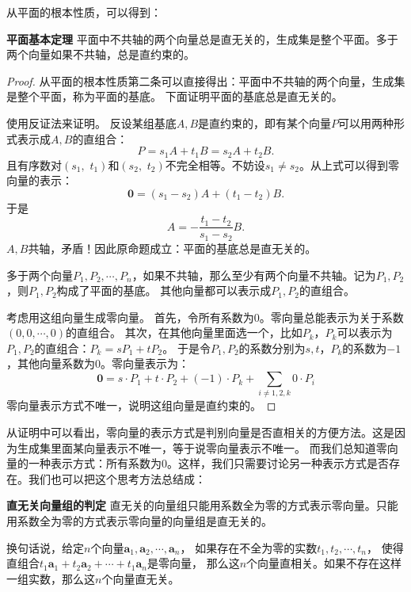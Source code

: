 \documentclass[12pt,UTF8,fontset=none]{ctexbook}
\begin{document}
从平面的根本性质，可以得到：
\begin{tm}{\textbf{平面基本定理}}\label{tm:0-0-20}
    平面中不共轴的两个向量总是直无关的，生成集是整个平面。多于两个向量如果不共轴，总是直约束的。
\end{tm}
\begin{proof}
    从平面的根本性质第二条可以直接得出：平面中不共轴的两个向量，生成集是整个平面，称为平面的基底。
    下面证明平面的基底总是直无关的。
    
    使用反证法来证明。
    反设某组基底$A,B$是直约束的，即有某个向量$P$可以用两种形式表示成$A,B$的直组合：
    $$ P = s_1A + t_1B = s_2A + t_2B. $$
    且有序数对$(s_1, \,\,t_1)$和$(s_2, \,\,t_2)$不完全相等。不妨设$s_1 \neq s_2$。从上式可以得到零向量的表示：
    $$ \mathbf{0} = (s_1 - s_2)A + (t_1 - t_2)B.$$
    于是
    $$ A = -\frac{t_1 - t_2}{s_1 - s_2} B.$$
    $A, B$共轴，矛盾！因此原命题成立：平面的基底总是直无关的。

    多于两个向量$P_1, P_2, \cdots , P_n$，如果不共轴，那么至少有两个向量不共轴。记为$P_1, P_2$，则$P_1, P_2$构成了平面的基底。
    其他向量都可以表示成$P_1, P_2$的直组合。
    
    考虑用这组向量生成零向量。
    首先，令所有系数为$0$。零向量总能表示为关于系数$(0,0,\cdots,0)$的直组合。
    其次，在其他向量里面选一个，比如$P_k$，$P_k$可以表示为$P_1, P_2$的直组合：$P_k = sP_1 + tP_2$。
    于是令$P_1,P_2$的系数分别为$s,t$，$P_k$的系数为$-1$，其他向量系数为$0$。零向量表示为：
    $$ \mathbf{0} = s\cdot P_1 + t\cdot P_2 + (-1)\cdot P_k + \sum_{i\neq 1,2,k} 0\cdot P_i$$
    零向量表示方式不唯一，说明这组向量是直约束的。
\end{proof}

从证明中可以看出，零向量的表示方式是判别向量是否直相关的方便方法。这是因为生成集里面某向量表示不唯一，等于说零向量表示不唯一。
而我们总知道零向量的一种表示方式：所有系数为$0$。这样，我们只需要讨论另一种表示方式是否存在。我们也可以把这个思考方法总结成：

\begin{tm}{\textbf{直无关向量组的判定}}\label{tm:0-0-25}
    直无关的向量组只能用系数全为零的方式表示零向量。只能用系数全为零的方式表示零向量的向量组是直无关的。
\end{tm}

换句话说，给定$n$个向量$\mathbf{a}_1, \mathbf{a}_2, \cdots , \mathbf{a}_n$，
如果存在不全为零的实数$t_1, t_2, \cdots , t_n$，
使得直组合$t_1\mathbf{a}_1 + t_2\mathbf{a}_2 + \cdots + t_1\mathbf{a}_n$是零向量，
那么这$n$个向量直相关。如果不存在这样一组实数，那么这$n$个向量直无关。
\end{document}
